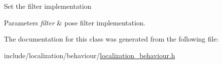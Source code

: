 Set the filter implementation 
\begin{DoxyParams}{Parameters}
{\em filter} & pose filter implementation. \\
\hline
\end{DoxyParams}


The documentation for this class was generated from the following file\-:\begin{DoxyCompactItemize}
\item 
include/localization/behaviour/\hyperlink{localization__behaviour_8h}{localization\-\_\-behaviour.\-h}\end{DoxyCompactItemize}
